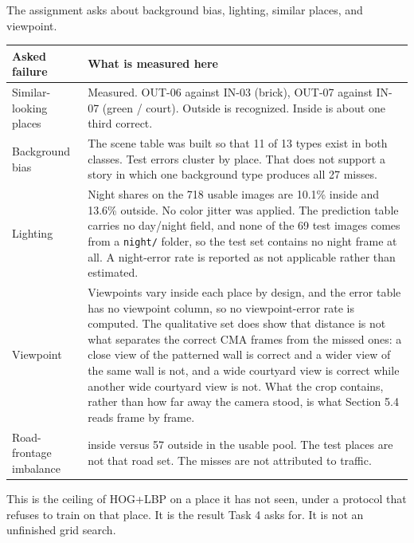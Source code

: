 \documentclass[11pt,a4paper]{article}
\providecommand{\real}[1]{#1}
\newcounter{none}
\begin{document}
The assignment asks about background bias, lighting, similar places, and viewpoint.

{\def\LTcaptype{none} %
\begin{longtable}[]{@{}
  >{\raggedright\arraybackslash}p{(\linewidth - 2\tabcolsep) * \real{0.5000}}
  >{\raggedright\arraybackslash}p{(\linewidth - 2\tabcolsep) * \real{0.5000}}@{}}
\toprule\noalign{}
\begin{minipage}[b]{\linewidth}\raggedright
Asked failure
\end{minipage} & \begin{minipage}[b]{\linewidth}\raggedright
What is measured here
\end{minipage} \\
\midrule\noalign{}
\endhead
\bottomrule\noalign{}
\endlastfoot
Similar-looking places & Measured. OUT-06 against IN-03 (brick), OUT-07 against IN-07 (green / court). Outside is recognized. Inside is about one third correct. \\
Background bias & The scene table was built so that 11 of 13 types exist in both classes. Test errors cluster by place. That does not support a story in which one background type produces all 27 misses. \\
Lighting & Night shares on the 718 usable images are 10.1\% inside and 13.6\% outside. No color jitter was applied. The prediction table carries no day/night field, and none of the 69 test images comes from a \texttt{night/\allowbreak{}} folder, so the test set contains no night frame at all. A night-error rate is reported as not applicable rather than estimated. \\
Viewpoint & Viewpoints vary inside each place by design, and the error table has no viewpoint column, so no viewpoint-error rate is computed. The qualitative set does show that distance is not what separates the correct CMA frames from the missed ones: a close view of the patterned wall is correct and a wider view of the same wall is not, and a wide courtyard view is correct while another wide courtyard view is not. What the crop contains, rather than how far away the camera stood, is what Section 5.4 reads frame by frame. \\
Road-frontage imbalance & 10 inside versus 57 outside in the usable pool. The test places are not that road set. The misses are not attributed to traffic. \\
\end{longtable}
}

This is the ceiling of HOG+LBP on a place it has not seen, under a protocol that refuses to train on that place. It is the result Task 4 asks for. It is not an unfinished grid search.
\end{document}
